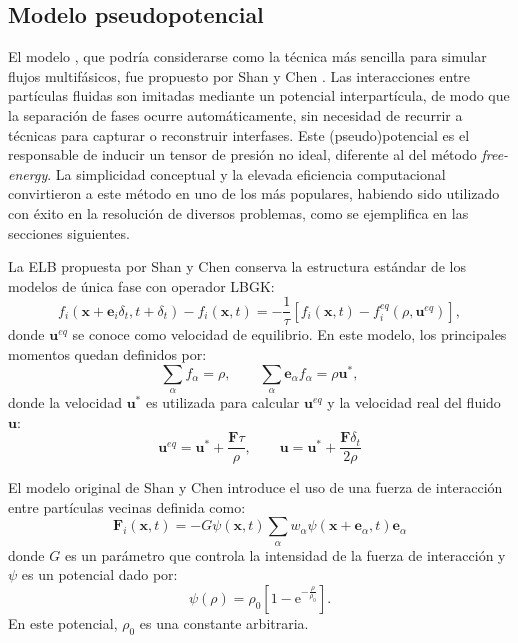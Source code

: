 \subsection{Modelo pseudopotencial}
El modelo \pp{}, que podr\'ia considerarse como la t\'ecnica m\'as sencilla para simular flujos multif\'asicos, fue propuesto por Shan y Chen \cite{shan_lattice_1993,shan_simulation_1994}. Las interacciones entre part\'iculas fluidas son imitadas mediante un potencial interpart\'icula, de modo que la separaci\'on de fases ocurre autom\'aticamente, sin necesidad de recurrir a t\'ecnicas para capturar o reconstruir interfases. Este (pseudo)potencial es el responsable de inducir un tensor de presi\'on no ideal, diferente al del m\'etodo \emph{free-energy}. La simplicidad conceptual y la elevada eficiencia computacional convirtieron a este m\'etodo en uno de los m\'as populares, habiendo sido utilizado con \'exito en la resoluci\'on de diversos problemas, como se ejemplifica en las secciones siguientes.
\par 
La ELB propuesta por Shan y Chen conserva la estructura est\'andar de los modelos de \'unica fase con operador LBGK:
\begin{equation}
	f_i(\bm{x}+\bm{e}_i\delta_t,t+\delta_t) - f_i(\bm{x},t)= -\dfrac{1}{\tau}\left[ f_i(\bm{x},t) - f_i^{eq}(\rho,\bm{u}^{eq}) \right],
\end{equation}
donde $\bm{u}^{eq}$ se conoce como velocidad de equilibrio. En este modelo, los principales momentos quedan definidos por:
\begin{equation}
	\sum_{\alpha} f_{\alpha} = \rho, \qquad	\sum_{\alpha} \bm{e}_{\alpha} f_{\alpha} = \rho \bm{u}^*,
\end{equation}
donde la velocidad $\bm{u}^*$ es utilizada para calcular $\bm{u}^{eq}$ y la velocidad real del fluido $\bm{u}$:
\begin{equation}
	\bm{u}^{eq} = \bm{u}^* + \dfrac{\bm{F}\tau}{\rho}, \qquad \bm{u} = \bm{u}^* + \dfrac{\bm{F}\delta_t}{2\rho}
\end{equation}

El modelo original de Shan y Chen introduce el uso de una fuerza de interacci\'on entre part\'iculas vecinas definida como:
\begin{equation}
	\bm{F}_{i}(\bm{x},t) = -G\psi(\bm{x},t)\sum_{\alpha} w_{\alpha} \psi(\bm{x}+\bm{e}_{\alpha},t)\bm{e}_{\alpha}
\end{equation}
donde $G$ es un par\'ametro que controla la intensidad de la fuerza de interacci\'on y $\psi$ es un potencial dado por:
\begin{equation}
	\psi(\rho) = \rho_0 \left[ 1-\mbox{e}^{-\frac{\rho}{\rho_0}} \right].
\end{equation}
En este potencial, $\rho_0$ es una constante arbitraria.

